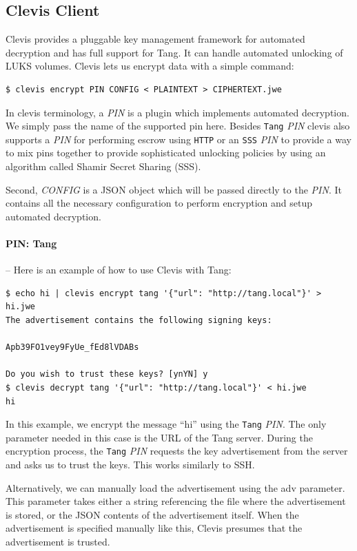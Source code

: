 \subsection{Clevis Client}\label{clevis}

Clevis provides a pluggable key management framework for automated decryption and has full support for Tang.
It can handle automated unlocking of LUKS volumes.
Clevis lets us encrypt data with a simple command:
\begin{lstlisting}[columns=fixed,basicstyle=\ttfamily\footnotesize,tabsize=4,backgroundcolor=\color{yellow!10}]
$ clevis encrypt PIN CONFIG < PLAINTEXT > CIPHERTEXT.jwe
\end{lstlisting}
In clevis terminology, a {\it PIN} is a plugin which implements automated decryption.
We simply pass the name of the supported pin here.
Besides {\tt Tang} {\it PIN} clevis also supports a {\it PIN} for performing escrow using {\tt HTTP} or an {\tt SSS} {\it PIN} to provide a way to mix pins together to provide sophisticated unlocking policies by using an algorithm called Shamir Secret Sharing (SSS).%

Second, {\it CONFIG} is a JSON object which will be passed directly to the {\it PIN}.
It contains all the necessary configuration to perform encryption and setup automated decryption.


\paragraph{PIN: Tang} -- Here is an example of how to use Clevis with Tang:
\begin{lstlisting}[columns=fixed,basicstyle=\ttfamily\footnotesize,tabsize=4,backgroundcolor=\color{yellow!10}]
$ echo hi | clevis encrypt tang '{"url": "http://tang.local"}' > hi.jwe
The advertisement contains the following signing keys:

Apb39FO1vey9FyUe_fEd8lVDABs

Do you wish to trust these keys? [ynYN] y
$ clevis decrypt tang '{"url": "http://tang.local"}' < hi.jwe
hi
\end{lstlisting}
In this example, we encrypt the message “hi” using the {\tt Tang} {\it PIN}.
The only parameter needed in this case is the URL of the Tang server.
During the encryption process, the {\tt Tang} {\it PIN} requests the key advertisement from the server and asks us to trust the keys.
This works similarly to SSH.

Alternatively, we can manually load the advertisement using the adv parameter.
This parameter takes either a string referencing the file where the advertisement is stored, or the JSON contents of the advertisement itself.
When the advertisement is specified manually like this, Clevis presumes that the advertisement is trusted.



